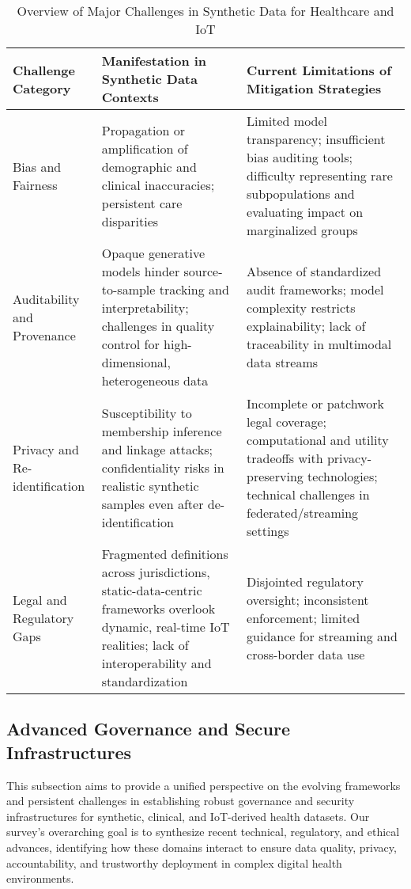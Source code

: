 \documentclass[sigconf]{acmart}
\begin{document}
\begin{table*}[htbp]
\centering
\caption{Overview of Major Challenges in Synthetic Data for Healthcare and IoT}
\label{tab:challenges_overview}
\begin{adjustbox}{max width=\textwidth}
\begin{tabular}{lll}
\toprule
\textbf{Challenge Category} & \textbf{Manifestation in Synthetic Data Contexts} & \textbf{Current Limitations of Mitigation Strategies} \\
\midrule
Bias and Fairness & Propagation or amplification of demographic and clinical inaccuracies; persistent care disparities~\cite{ref63} & Limited model transparency; insufficient bias auditing tools; difficulty representing rare subpopulations and evaluating impact on marginalized groups \\
Auditability and Provenance & Opaque generative models hinder source-to-sample tracking and interpretability; challenges in quality control for high-dimensional, heterogeneous data~\cite{ref50,ref54,ref84,ref106} & Absence of standardized audit frameworks; model complexity restricts explainability; lack of traceability in multimodal data streams \\
Privacy and Re-identification & Susceptibility to membership inference and linkage attacks; confidentiality risks in realistic synthetic samples even after de-identification~\cite{ref91,ref106,ref51} & Incomplete or patchwork legal coverage; computational and utility tradeoffs with privacy-preserving technologies; technical challenges in federated/streaming settings \\
Legal and Regulatory Gaps & Fragmented definitions across jurisdictions, static-data-centric frameworks overlook dynamic, real-time IoT realities; lack of interoperability and standardization~\cite{ref82,ref83,ref84} & Disjointed regulatory oversight; inconsistent enforcement; limited guidance for streaming and cross-border data use \\
\bottomrule
\end{tabular}
\end{adjustbox}
\end{table*}

\subsection{Advanced Governance and Secure Infrastructures}

This subsection aims to provide a unified perspective on the evolving frameworks and persistent challenges in establishing robust governance and security infrastructures for synthetic, clinical, and IoT-derived health datasets. Our survey's overarching goal is to synthesize recent technical, regulatory, and ethical advances, identifying how these domains interact to ensure data quality, privacy, accountability, and trustworthy deployment in complex digital health environments.
\end{document}
